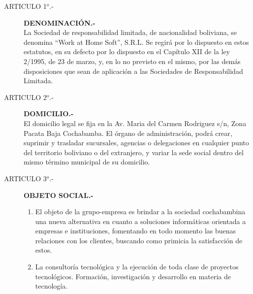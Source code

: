 \documentclass[11pt,letterpaper]{report}
\begin{document}
\begin{description}
\item[ARTICULO 1$^{o}$.-] {\bf DENOMINACI\'ON.-}\\ La Sociedad de responsabilidad limitada, de nacionalidad boliviana, se denomina “Work at Home Soft”, S.R.L. Se regir\'a por lo dispuesto en estos estatutos, en su defecto por lo dispuesto en el Cap\'itulo XII de la ley 2/1995, de 23 de marzo, y, en lo no previsto en el mismo, por las dem\'as disposiciones que sean de aplicaci\'on a las Sociedades de Responsabilidad Limitada.
\item[ARTICULO 2$^{o}$.-] {\bf DOMICILIO.-}\\ El domicilio legal se fija en la Av. Maria del Carmen Rodriguez s/n, Zona Pacata Baja Cochabamba.
El \'organo de administraci\'on, podr\'a crear, suprimir y trasladar sucursales, agencias o delegaciones en cualquier punto del territorio boliviano o del extranjero, y variar la sede social dentro del mismo t\'ermino municipal de su domicilio.
\item[ARTICULO 3$^{o}$.-] {\bf OBJETO SOCIAL.- }
\begin{enumerate}
\item El objeto de la grupo-empresa es brindar a la sociedad cochabambina una nueva alternativa en cuanto a soluciones inform\'aticas orientada a empresas e instituciones, fomentando en todo momento las buenas relaciones con los clientes, buscando como primicia la satisfacci\'on de estos.
\item La consultor\'ia tecnol\'ogica y la ejecuci\'on de toda clase de proyectos tecnol\'ogicos. Formaci\'on, investigaci\'on y desarrollo en materia de tecnolog\'ia.
\end{enumerate}
\end{description}
\end{document}
